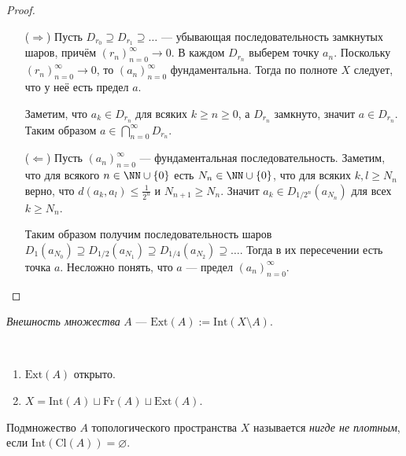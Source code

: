 \documentclass[12pt,a4paper]{article}
\newcommand{\Int}{\ensuremath{\mathrm{Int}}\xspace}
\newcommand{\Ext}{\ensuremath{\mathrm{Ext}}\xspace}
\newcommand{\Cl}{\ensuremath{\mathrm{Cl}}\xspace}
\newcommand{\Fr}{\ensuremath{\mathrm{Fr}}\xspace}
\begin{document}
    \begin{proof}\ 
        \begin{itemize}
            \item[($\Rightarrow$)] Пусть $D_{r_0} \supseteq D_{r_1} \supseteq \dots$ --- убывающая последовательность замкнутых шаров, причём $(r_n)_{n=0}^\infty \to 0$. В каждом $D_{r_n}$ выберем точку $a_n$. Поскольку $(r_n)_{n=0}^\infty \to 0$, то $(a_n)_{n=0}^\infty$ фундаментальна. Тогда по полноте $X$ следует, что у неё есть предел $a$.
            
            Заметим, что $a_k \in D_{r_n}$ для всяких $k \geqslant n \geqslant 0$, а $D_{r_n}$ замкнуто, значит $a \in D_{r_n}$. Таким образом $a \in \bigcap_{n=0}^\infty D_{r_n}$.

            \item[($\Leftarrow$)] Пусть $(a_n)_{n=0}^\infty$ --- фундаментальная последовательность. Заметим, что для всякого $n \in \NN \cup \{0\}$ есть $N_n \in \NN \cup \{0\}$, что для всяких $k, l \geqslant N_n$ верно, что $d(a_k, a_l) \leqslant \frac{1}{2^n}$ и $N_{n+1} \geqslant N_n$. Значит $a_k \in D_{1/2^n}(a_{N_n})$ для всех $k \geqslant N_n$.
            
            Таким образом получим последовательность шаров $D_{1}(a_{N_0}) \supseteq D_{1/2}(a_{N_1}) \supseteq D_{1/4}(a_{N_2}) \supseteq \dots$. Тогда в их пересечении есть точка $a$. Несложно понять, что $a$ --- предел $(a_n)_{n=0}^\infty$.
        \end{itemize}
    \end{proof}

    \begin{definition}
        \emph{Внешность множества} $A$ --- $\Ext(A) := \Int(X \setminus A)$.
    \end{definition}

    \begin{lemma}\ 
        \begin{multicols}{2}
            \begin{enumerate}
                \item $\Ext(A)$ открыто.
                \item $X = \Int(A) \sqcup \Fr(A) \sqcup \Ext(A)$.
            \end{enumerate}
        \end{multicols}
    \end{lemma}

    \begin{definition}
        Подмножество $A$ топологического пространства $X$ называется \emph{нигде не плотным}, если $\Int(\Cl(A)) = \varnothing$.
    \end{definition}
\end{document}
